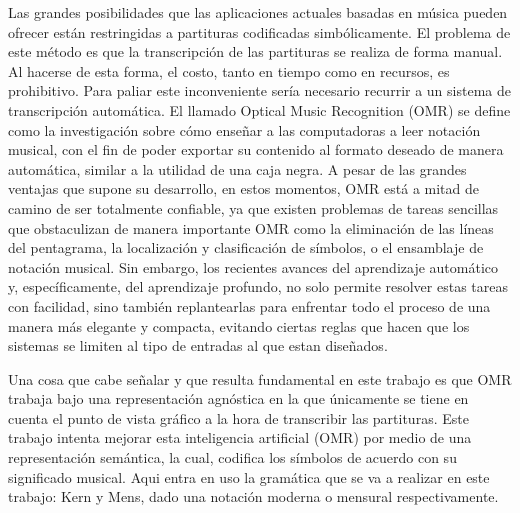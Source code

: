 \documentclass{article}
\begin{document}
Las grandes posibilidades que las aplicaciones actuales basadas en música pueden ofrecer están restringidas a partituras codificadas
simbólicamente.
El problema de este método es que la transcripción de las partituras se realiza de forma manual.
Al hacerse de esta forma, el costo, tanto en tiempo como en recursos, es prohibitivo. Para paliar este inconveniente sería necesario recurrir a un sistema
 de transcripción automática. El llamado Optical Music Recognition (OMR) se define como la investigación sobre cómo enseñar a las
computadoras a leer notación musical, con el fin de poder exportar su contenido al formato deseado de manera automática, similar a la
utilidad de una caja negra. A pesar de las grandes ventajas que supone su desarrollo, en estos momentos, OMR está a mitad de camino de
ser totalmente confiable, ya que existen problemas de tareas sencillas que obstaculizan de manera importante OMR como la eliminación de
las líneas del pentagrama, la localización y clasificación de símbolos, o el ensamblaje de notación musical. Sin embargo, los recientes
avances del aprendizaje automático y, específicamente, del aprendizaje profundo, no solo permite resolver estas tareas con facilidad,
sino también replantearlas para enfrentar todo el proceso de una manera más elegante y compacta, evitando ciertas reglas que hacen que los
sistemas se limiten al tipo de entradas al que estan diseñados.

Una cosa que cabe señalar y que resulta fundamental en este trabajo es que OMR trabaja bajo una representación agnóstica en la que
únicamente se tiene en cuenta el punto de vista gráfico a la hora de transcribir las partituras. Este trabajo intenta mejorar esta
inteligencia artificial (OMR) por medio de una representación semántica, la cual, codifica los símbolos de acuerdo con su significado
musical. Aqui entra en uso la gramática que se va a realizar en este trabajo: Kern y Mens, dado una notación moderna o mensural respectivamente.
\end{document}

